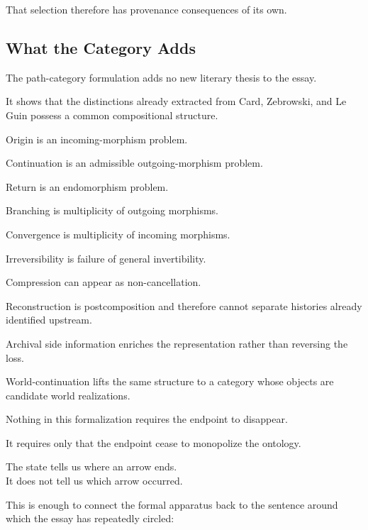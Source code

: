 \documentclass[
  11pt,
  a4paper,
  DIV=12,
  BCOR=0mm,
  parskip=half-
]{scrartcl}
\theoremstyle{definition}
\theoremstyle{plain}
\theoremstyle{remark}
\begin{document}
That selection therefore has provenance consequences of its own.


\subsection{What the Category Adds}
\label{app:categorical-closure}

The path-category formulation adds no new literary thesis to the essay.

It shows that the distinctions already extracted from Card, Zebrowski, and
Le Guin possess a common compositional structure.

Origin is an incoming-morphism problem.

Continuation is an admissible outgoing-morphism problem.

Return is an endomorphism problem.

Branching is multiplicity of outgoing morphisms.

Convergence is multiplicity of incoming morphisms.

Irreversibility is failure of general invertibility.

Compression can appear as non-cancellation.

Reconstruction is postcomposition and therefore cannot separate histories
already identified upstream.

Archival side information enriches the representation rather than reversing
the loss.

World-continuation lifts the same structure to a category whose objects are
candidate world realizations.

Nothing in this formalization requires the endpoint to disappear.

It requires only that the endpoint cease to monopolize the ontology.

\begin{held}
\centering
The state tells us where an arrow ends.\\[3pt]
It does not tell us which arrow occurred.
\end{held}

This is enough to connect the formal apparatus back to the sentence around
which the essay has repeatedly circled:
\end{document}
